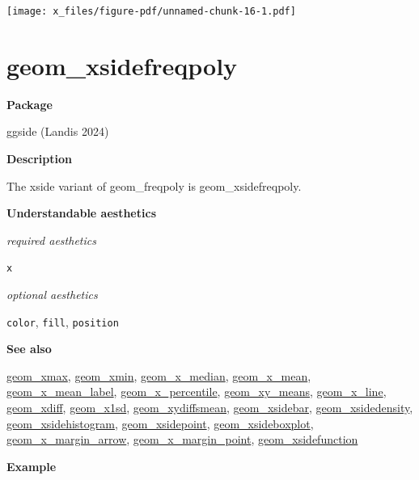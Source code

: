 \documentclass[
  letterpaper,
  DIV=11,
  numbers=noendperiod]{scrreprt}
\begin{document}
\texttt{[image: x\_files/figure-pdf/unnamed-chunk-16-1.pdf]}

\section{geom\_xsidefreqpoly}\label{xsidefreqpoly}

\textbf{Package}

ggside (Landis 2024)

\textbf{Description}

The xside variant of geom\_freqpoly is geom\_xsidefreqpoly.

\textbf{Understandable aesthetics}

\emph{required aesthetics}

\texttt{x}

\emph{optional aesthetics}

\texttt{color}, \texttt{fill}, \texttt{position}

\textbf{See also}

\href{@xmax}{geom\_xmax}, \href{@xmin}{geom\_xmin},
\href{@x_median}{geom\_x\_median}, \href{@x_mean}{geom\_x\_mean},
\href{@x_mean_label}{geom\_x\_mean\_label},
\href{@x_percentile}{geom\_x\_percentile},
\href{@xy_means}{geom\_xy\_means}, \href{@x_line}{geom\_x\_line},
\href{@xdiff}{geom\_xdiff}, \href{@x1sd}{geom\_x1sd},
\href{@xydiffsmean}{geom\_xydiffsmean},
\href{@xsidebar}{geom\_xsidebar},
\href{@xsidedensity}{geom\_xsidedensity},
\href{@xsidehistogram}{geom\_xsidehistogram},
\href{@xsidepoint}{geom\_xsidepoint},
\href{@xsideboxplot}{geom\_xsideboxplot},
\href{@x_margin_arrow}{geom\_x\_margin\_arrow},
\href{@x_margin_point}{geom\_x\_margin\_point},
\href{@xsidefunction}{geom\_xsidefunction}

\textbf{Example}
\end{document}

